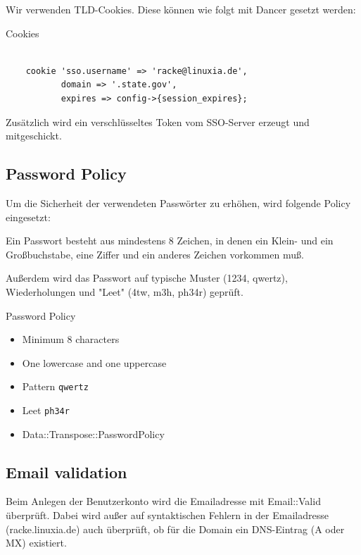 Wir verwenden TLD-Cookies. Diese können wie folgt mit Dancer
gesetzt werden:

\begin{frame}[fragile]{Cookies}
\begin{lstlisting}

    cookie 'sso.username' => 'racke@linuxia.de',
           domain => '.state.gov',
           expires => config->{session_expires};

\end{lstlisting}
\end{frame}

Zusätzlich wird ein verschlüsseltes Token vom SSO-Server
erzeugt und mitgeschickt.                       
                       
\subsection{Password Policy}

Um die Sicherheit der verwendeten Passwörter zu erhöhen, wird
folgende Policy eingesetzt:

Ein Passwort besteht aus mindestens 8 Zeichen, in denen
ein Klein- und ein Großbuchstabe, eine Ziffer und ein
anderes Zeichen vorkommen muß.

Außerdem wird das Passwort auf typische Muster (1234, qwertz),
Wiederholungen und "Leet" (4tw, m3h, ph34r) geprüft.

\begin{frame}[fragile]{Password Policy}
\begin{itemize}
\item Minimum 8 characters
\item One lowercase and one uppercase
\item Pattern \verb|qwertz|
\item Leet \verb|ph34r|
\item Data::Transpose::PasswordPolicy
\end{itemize}
\end{frame}

\subsection{Email validation}

Beim Anlegen der Benutzerkonto wird die Emailadresse
mit Email::Valid überprüft. Dabei wird außer auf
syntaktischen Fehlern in der Emailadresse (racke.linuxia.de)
auch überprüft, ob für die Domain ein DNS-Eintrag (A oder MX)
existiert.    
                   
